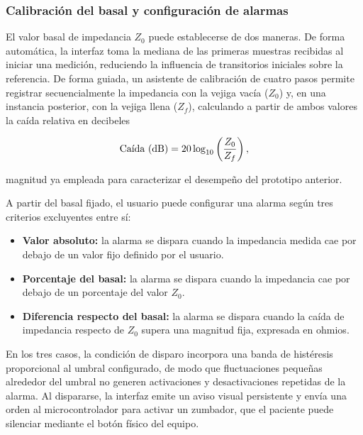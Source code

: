 \documentclass[12pt,a4paper]{article}
\begin{document}
\subsubsection{Calibración del basal y configuración de alarmas}

El valor basal de impedancia $Z_0$ puede establecerse de dos maneras. De forma automática, la interfaz
toma la mediana de las primeras muestras recibidas al iniciar una medición, reduciendo la influencia de
transitorios iniciales sobre la referencia. De forma guiada, un asistente de calibración de cuatro pasos
permite registrar secuencialmente la impedancia con la vejiga vacía ($Z_0$) y, en una instancia
posterior, con la vejiga llena ($Z_f$), calculando a partir de ambos valores la caída relativa en
decibeles

\begin{equation}
    \mbox{Ca\'{\i}da (dB)} = 20\log_{10}\left(\frac{Z_0}{Z_f}\right),
\end{equation}

magnitud ya empleada para caracterizar el desempeño del prototipo anterior.

A partir del basal fijado, el usuario puede configurar una alarma según tres criterios excluyentes entre
sí:

\begin{itemize}
    \item \textbf{Valor absoluto:} la alarma se dispara cuando la impedancia medida cae por debajo de un
    valor fijo definido por el usuario.
    \item \textbf{Porcentaje del basal:} la alarma se dispara cuando la impedancia cae por debajo de un
    porcentaje del valor $Z_0$.
    \item \textbf{Diferencia respecto del basal:} la alarma se dispara cuando la caída de impedancia
    respecto de $Z_0$ supera una magnitud fija, expresada en ohmios.
\end{itemize}

En los tres casos, la condición de disparo incorpora una banda de histéresis proporcional al umbral
configurado, de modo que fluctuaciones pequeñas alrededor del umbral no generen activaciones y
desactivaciones repetidas de la alarma. Al dispararse, la interfaz emite un aviso visual persistente y
envía una orden al microcontrolador para activar un zumbador, que el paciente puede silenciar mediante el
botón físico del equipo.
\end{document}
